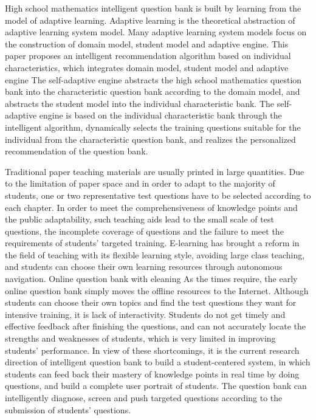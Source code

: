 
High school mathematics intelligent question bank is built by learning from the model of adaptive learning. Adaptive learning is the theoretical abstraction of adaptive learning system model. Many adaptive learning system models focus on the construction of domain model, student model and adaptive engine. This paper proposes an intelligent recommendation algorithm based on individual characteristics, which integrates domain model, student model and adaptive engine The self-adaptive engine abstracts the high school mathematics question bank into the characteristic question bank according to the domain model, and abstracts the student model into the individual characteristic bank. The self-adaptive engine is based on the individual characteristic bank through the intelligent algorithm, dynamically selects the training questions suitable for the individual from the characteristic question bank, and realizes the personalized recommendation of the question bank. 

Traditional paper teaching materials are usually printed in large quantities. Due to the limitation of paper space and in order to adapt to the majority of students, one or two representative test questions have to be selected according to each chapter. In order to meet the comprehensiveness of knowledge points and the public adaptability, such teaching aids lead to the small scale of test questions, the incomplete coverage of questions and the failure to meet the requirements of students' targeted training. E-learning has brought a reform in the field of teaching with its flexible learning style, avoiding large class teaching, and students can choose their own learning resources through autonomous navigation. Online question bank with eleaning As the times require, the early online question bank simply moves the offline resources to the Internet. Although students can choose their own topics and find the test questions they want for intensive training, it is lack of interactivity. Students do not get timely and effective feedback after finishing the questions, and can not accurately locate the strengths and weaknesses of students, which is very limited in improving students' performance. In view of these shortcomings, it is the current research direction of intelligent question bank to build a student-centered system, in which students can feed back their mastery of knowledge points in real time by doing questions, and build a complete user portrait of students. The question bank can intelligently diagnose, screen and push targeted questions according to the submission of students' questions.

